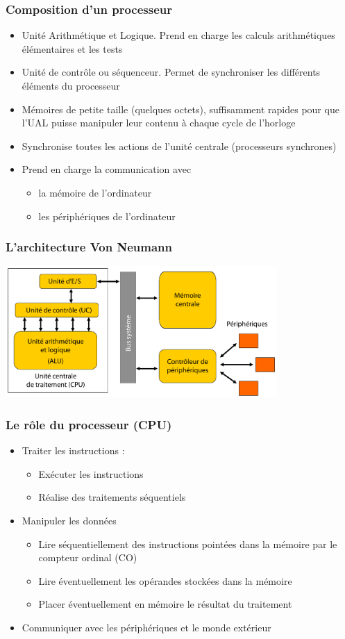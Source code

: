 \begin{frame}
\frametitle{Composition d'un processeur}
\begin{itemize}
\item <1> [ALU] Unité Arithmétique et Logique. Prend en charge les calculs arithmétiques élémentaires et les tests \cite{wp-cpu}
\item <2> [UC] Unité de contrôle ou séquenceur. Permet de synchroniser les différents éléments du processeur
\item <3> [Registres] Mémoires de petite taille (quelques octets), suffisamment rapides pour que l'UAL puisse manipuler leur contenu à chaque cycle de l’horloge
\item <4> [Horloge] Synchronise toutes les actions de l’unité centrale (processeurs synchrones)
\item <5> [Unité E/S] Prend en charge la communication avec
\begin{itemize}
\item la mémoire de l’ordinateur
\item les périphériques de l’ordinateur
\end{itemize}
\end{itemize}

\end{frame}

\begin{frame}
\frametitle{L'architecture Von Neumann}
\includegraphics[height=5cm]{../illustration/archi_von_neumann.pdf}
\end{frame}

\begin{frame}
\frametitle{Le rôle du processeur (CPU)}
\begin{itemize}
\item Traiter les instructions :
\begin{itemize}
\item Exécuter les instructions
\item Réalise des traitements séquentiels
\end {itemize}
\item Manipuler les données
\begin{itemize}
\item Lire séquentiellement des instructions pointées dans la mémoire par le compteur ordinal (CO)
\item Lire éventuellement les opérandes stockées dans la mémoire
\item Placer éventuellement en mémoire le résultat du traitement
\end{itemize}
\item Communiquer avec les périphériques et le monde extérieur
\end{itemize}
\end{frame}


